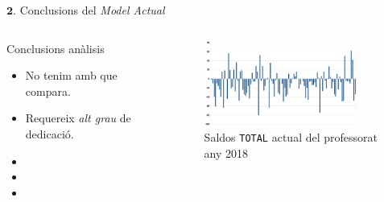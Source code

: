 \documentclass[twocolumn]{beamer}
\begin{document}
\begin{frame}{$\mathbf 2.$ Conclusions del \textit{Model Actual}}
\begin{columns}[t]
	\begin{column}{.5\textwidth}
		\begin{block}{Conclusions anàlisis}
			\begin{itemize}
				\item No tenim amb que compara.
				\item Requereix \textit{alt grau} de dedicació.
				\item 
				\item\item
			\end{itemize}
		\end{block}
	\end{column}
	\begin{column}{.5\textwidth}
\begin{figure}
	\includegraphics[width=5cm]{saldo_actual}
	\caption{Saldos \texttt{TOTAL} actual del professorat any 2018}
\end{figure}
	\end{column}
\end{columns}
\end{frame}
\end{document}

